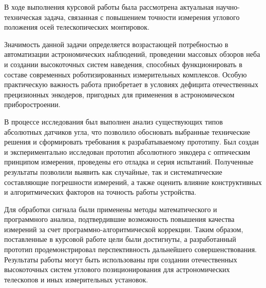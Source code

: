 В ходе выполнения курсовой работы была рассмотрена актуальная научно-техническая задача, связанная с повышением точности измерения углового положения осей телескопических монтировок.

Значимость данной задачи определяется возрастающей потребностью в автоматизации астрономических наблюдений, проведении массовых обзоров неба и создании высокоточных систем наведения, способных функционировать в составе современных роботизированных измерительных комплексов. Особую практическую важность работа приобретает в условиях дефицита отечественных прецизионных энкодеров, пригодных для применения в астрономическом приборостроении.

В процессе исследования был выполнен анализ существующих типов абсолютных датчиков угла, что позволило обосновать выбранные технические решения и сформировать требования к разрабатываемому прототипу. Был создан и экспериментально исследован прототип абсолютного энкодера с оптическим принципом измерения, проведены его отладка и серия испытаний. Полученные результаты позволили выявить как случайные, так и систематические составляющие погрешности измерений, а также оценить влияние конструктивных и алгоритмических факторов на точность работы устройства.

Для обработки сигнала были применены методы математического и программного анализа, подтвердившие возможность повышения качества измерений за счет программно-алгоритмической коррекции. Таким образом, поставленные в курсовой работе цели были достигнуты, а разработанный прототип продемонстрировал перспективность дальнейшего совершенствования. Результаты работы могут быть использованы при создании отечественных высокоточных систем углового позиционирования для астрономических телескопов и иных измерительных установок.